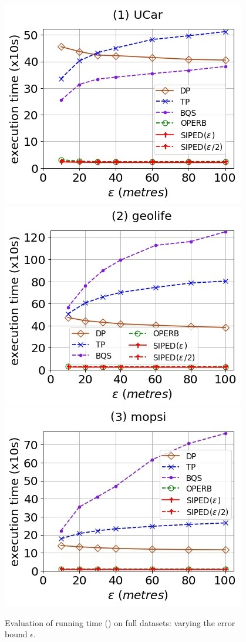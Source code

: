 \begin{figure}[tb!]
	\centering
	\includegraphics[scale=0.500]{Figures/Exp-PED-time-epsilon-service.jpg}	\hspace{2ex}
	\includegraphics[scale=0.500]{Figures/Exp-PED-time-epsilon-geolife.jpg}	\hspace{2ex}
	\includegraphics[scale=0.500]{Figures/Exp-PED-time-epsilon-mopsi.jpg}	
	\vspace{-2ex}
	\caption{\small Evaluation of running time (\ped) on full datasets: varying the error bound $\epsilon$.}\label{fig:time-epsilon-ped}
	\vspace{-2ex}
\end{figure}

